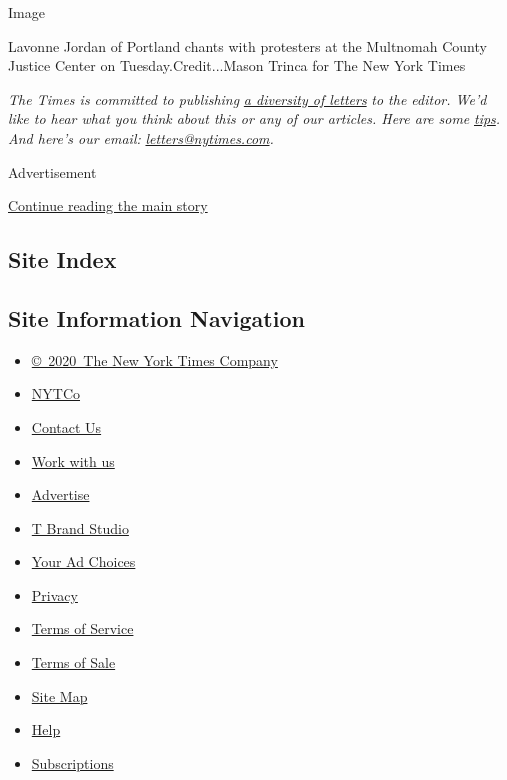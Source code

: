 Image

Lavonne Jordan of Portland chants with protesters at the Multnomah
County Justice Center on Tuesday.Credit...Mason Trinca for The New York
Times

\emph{The Times is committed to publishing}
\href{https://www.nytimes.com/2019/01/31/opinion/letters/letters-to-editor-new-york-times-women.html}{\emph{a
diversity of letters}} \emph{to the editor. We'd like to hear what you
think about this or any of our articles. Here are some}
\href{https://help.nytimes.com/hc/en-us/articles/115014925288-How-to-submit-a-letter-to-the-editor}{\emph{tips}}\emph{.
And here's our email:}
\href{mailto:letters@nytimes.com}{\emph{letters@nytimes.com}}\emph{.}

Advertisement

\protect\hyperlink{after-bottom}{Continue reading the main story}

\hypertarget{site-index}{%
\subsection{Site Index}\label{site-index}}

\hypertarget{site-information-navigation}{%
\subsection{Site Information
Navigation}\label{site-information-navigation}}

\begin{itemize}
\tightlist
\item
  \href{https://help.nytimes.com/hc/en-us/articles/115014792127-Copyright-notice}{©~2020~The
  New York Times Company}
\end{itemize}

\begin{itemize}
\tightlist
\item
  \href{https://www.nytco.com/}{NYTCo}
\item
  \href{https://help.nytimes.com/hc/en-us/articles/115015385887-Contact-Us}{Contact
  Us}
\item
  \href{https://www.nytco.com/careers/}{Work with us}
\item
  \href{https://nytmediakit.com/}{Advertise}
\item
  \href{http://www.tbrandstudio.com/}{T Brand Studio}
\item
  \href{https://www.nytimes.com/privacy/cookie-policy\#how-do-i-manage-trackers}{Your
  Ad Choices}
\item
  \href{https://www.nytimes.com/privacy}{Privacy}
\item
  \href{https://help.nytimes.com/hc/en-us/articles/115014893428-Terms-of-service}{Terms
  of Service}
\item
  \href{https://help.nytimes.com/hc/en-us/articles/115014893968-Terms-of-sale}{Terms
  of Sale}
\item
  \href{https://spiderbites.nytimes.com}{Site Map}
\item
  \href{https://help.nytimes.com/hc/en-us}{Help}
\item
  \href{https://www.nytimes.com/subscription?campaignId=37WXW}{Subscriptions}
\end{itemize}

